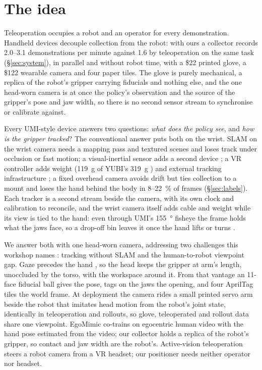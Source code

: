 \section{The idea}
\label{sec:idea}
Teleoperation occupies a robot and an operator for every demonstration. Handheld devices decouple collection from the robot: with ours a collector records 2.0--3.1 demonstrations per minute against 1.6 by teleoperation on the same task (\S\ref{sec:system}), in parallel and without robot time, with a \$22 printed glove, a \$122 wearable camera and four paper tiles. The glove is purely mechanical, a replica of the robot's gripper carrying fiducials and nothing else, and the one head-worn camera is at once the policy's observation and the source of the gripper's pose and jaw width, so there is no second sensor stream to synchronise or calibrate against.

Every UMI-style device answers two questions: \emph{what does the policy see}, and \emph{how is the gripper tracked}? The conventional answer puts both on the wrist. SLAM on the wrist camera \citep{chi2024umi,campos2021orbslam3} needs a mapping pass and textured scenes and loses track under occlusion or fast motion; a visual-inertial sensor adds a second device \citep{fastumi2024}; a VR controller adds weight (\SI{119}{g} of YUBI's \SI{319}{g} \citep{yubi2026,tinyumi2026}) and external tracking infrastructure \citep{vrtracking2024,quest2rehab2022}; a fixed overhead camera \citep{yamumi2026} avoids drift but ties collection to a mount and loses the hand behind the body in \SI{8}{}--\SI{22}{\percent} of frames (\S\ref{sec:labels}). Each tracker is a second stream beside the camera, with its own clock and calibration to reconcile, and the wrist camera itself adds cable and weight while its view is tied to the hand: even through UMI's \SI{155}{\degree} fisheye the frame holds what the jaws face, so a drop-off bin leaves it once the hand lifts or turns \citep{hsu2022hands}.

We answer both with one head-worn camera, addressing two challenges this workshop names \citep{umiarena2026}: tracking without SLAM and the human-to-robot viewpoint gap. Gaze precedes the hand \citep{land2001eye}, so the head keeps the gripper at arm's length, unoccluded by the torso, with the workspace around it. From that vantage an 11-face fiducial ball gives the pose, tags on the jaws the opening, and four AprilTag tiles \citep{olson2011apriltag} the world frame. At deployment the camera rides a small printed servo arm beside the robot that imitates head motion from the robot's joint state, identically in teleoperation and rollouts, so glove, teleoperated and rollout data share one viewpoint. EgoMimic \citep{kareer2025egomimic} co-trains on egocentric human video with the hand pose estimated from the video; our collector holds a replica of the robot's gripper, so contact and jaw width are the robot's. Active-vision teleoperation \citep{chuang2025avaloha,cheng2024opentelevision} steers a robot camera from a VR headset; our positioner needs neither operator nor headset.
